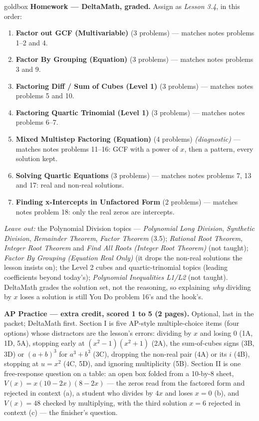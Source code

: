 \documentclass[10pt]{article}
\begin{document}
\begin{skillbox}{goldbox}
\textbf{Homework --- DeltaMath, graded.} Assign as \textit{Lesson 3.4}, in this order:
\begin{enumerate}[itemsep=1pt,topsep=2pt]
  \item \textbf{Factor out GCF (Multivariable)} (3 problems) --- matches notes problems 1--2
        and 4.
  \item \textbf{Factor By Grouping (Equation)} (3 problems) --- matches notes problems 3 and 9.
  \item \textbf{Factoring Diff / Sum of Cubes (Level 1)} (3 problems) --- matches notes
        problems 5 and 10.
  \item \textbf{Factoring Quartic Trinomial (Level 1)} (3 problems) --- matches notes problems
        6--7.
  \item \textbf{Mixed Multistep Factoring (Equation)} (4 problems) \textit{(diagnostic)} ---
        matches notes problems 11--16: GCF with a power of $x$, then a pattern, every solution
        kept.
  \item \textbf{Solving Quartic Equations} (3 problems) --- matches notes problems 7, 13 and
        17: real and non-real solutions.
  \item \textbf{Finding x-Intercepts in Unfactored Form} (2 problems) --- matches notes
        problem 18: only the real zeros are intercepts.
\end{enumerate}
\textit{Leave out:} the Polynomial Division topics --- \textit{Polynomial Long Division},
\textit{Synthetic Division}, \textit{Remainder Theorem}, \textit{Factor Theorem} (3.5);
\textit{Rational Root Theorem}, \textit{Integer Root Theorem} and \textit{Find All Roots
(Integer Root Theorem)} (not taught); \textit{Factor By Grouping (Equation Real Only)} (it
drops the non-real solutions the lesson insists on); the Level 2 cubes and quartic-trinomial
topics (leading coefficients beyond today's); \textit{Polynomial Inequalities L1/L2} (not
taught). DeltaMath grades the solution set, not the reasoning, so explaining \emph{why}
dividing by $x$ loses a solution is still You Do problem 16's and the hook's.

\textbf{AP Practice --- extra credit, scored 1 to 5 (2 pages).} Optional, last in the packet;
DeltaMath first. Section I is five AP-style multiple-choice items (four options) whose
distractors are the lesson's errors: dividing by $x$ and losing 0 (1A, 1D, 5A), stopping early
at $(x^2 - 1)(x^2 + 1)$ (2A), the sum-of-cubes signs (3B, 3D) or $(a + b)^3$ for $a^3 + b^3$
(3C), dropping the non-real pair (4A) or its $i$ (4B), stopping at $u = x^2$ (4C, 5D), and
ignoring multiplicity (5B). Section II is one free-response question on a table: an open box
folded from a 10-by-8 sheet, $V(x) = x(10 - 2x)(8 - 2x)$ --- the zeros read from the factored
form and rejected in context (a), a student who divides by $4x$ and loses $x = 0$ (b), and
$V(x) = 48$ checked by multiplying, with the third solution $x = 6$ rejected in context (c)
--- the finisher's question.


\end{skillbox}
\end{document}
